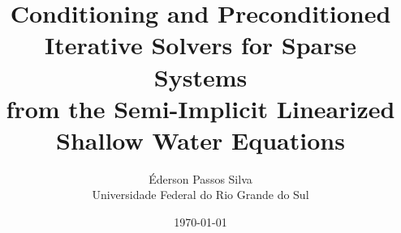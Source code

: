\documentclass[12pt,a4paper]{article}
\begin{document}
\title{Conditioning and Preconditioned Iterative Solvers for Sparse Systems \\
    from the Semi-Implicit Linearized Shallow Water Equations}
\author{Éderson Passos Silva\\{\small Universidade Federal do Rio Grande do Sul}}
\date{\today}
\maketitle







\end{document}
